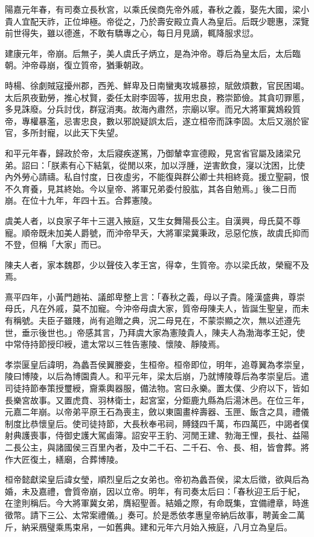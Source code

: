 \begin{pinyinscope}
陽嘉元年春，有司奏立長秋宮，以乘氏侯商先帝外戚，春秋之義，娶先大國，梁小貴人宜配天祚，正位坤極。帝從之，乃於壽安殿立貴人為皇后。后既少聰惠，深覽前世得失，雖以德進，不敢有驕專之心，每日月見謫，輒降服求愆。

建康元年，帝崩。后無子，美人虞氏子炳立，是為沖帝。尊后為皇太后，太后臨朝。沖帝尋崩，復立質帝，猶秉朝政。

時楊、徐劇賊寇擾州郡，西羌、鮮卑及日南蠻夷攻城暴掠，賦斂煩數，官民困竭。太后夙夜勤勞，推心杖賢，委任太尉李固等，拔用忠良，務崇節儉。其貪叨罪慝，多見誅廢。分兵討伐，群寇消夷。故海內肅然，宗廟以寧。而兄大將軍冀鴆殺質帝，專權暴濫，忌害忠良，數以邪說疑誤太后，遂立桓帝而誅李固。太后又溺於宦官，多所封寵，以此天下失望。

和平元年春，歸政於帝，太后寢疾遂篤，乃御輦幸宣德殿，見宮省官屬及諸梁兄弟。詔曰：「朕素有心下結氣，從閒以來，加以浮腫，逆害飲食，寖以沈困，比使內外勞心請禱。私自忖度，日夜虛劣，不能復與群公卿士共相終竟。援立聖嗣，恨不久育養，見其終始。今以皇帝、將軍兄弟委付股肱，其各自勉焉。」後二日而崩。在位十九年，年四十五。合葬憲陵。

虞美人者，以良家子年十三選入掖庭，又生女舞陽長公主。自漢興，母氏莫不尊寵。順帝既未加美人爵號，而沖帝早夭，大將軍梁冀秉政，忌惡佗族，故虞氏抑而不登，但稱「大家」而已。

陳夫人者，家本魏郡，少以聲伎入孝王宮，得幸，生質帝。亦以梁氏故，榮寵不及焉。

熹平四年，小黃門趙祐、議郎卑整上言：「春秋之義，母以子貴。隆漢盛典，尊崇母氏，凡在外戚，莫不加寵。今沖帝母虞大家，質帝母陳夫人，皆誕生聖皇，而未有稱號。夫臣子雖賤，尚有追贈之典，況二母見在，不蒙崇顯之次，無以述遵先世，垂示後世也。」帝感其言，乃拜虞大家為憲陵貴人，陳夫人為渤海孝王妃，使中常侍持節授印綬，遣太常以三牲告憲陵、懷陵、靜陵焉。

孝崇匽皇后諱明，為蠡吾侯翼媵妾，生桓帝。桓帝即位，明年，追尊翼為孝崇皇，陵曰博陵，以后為博園貴人。和平元年，梁太后崩，乃就博陵尊后為孝崇皇后。遣司徒持節奉策授璽綬，齎乘輿器服，備法物。宮曰永樂。置太僕、少府以下，皆如長樂宮故事。又置虎賁、羽林衛士，起宮室，分鉅鹿九縣為后湯沐邑。在位三年，元嘉二年崩。以帝弟平原王石為喪主，斂以東園畫梓壽器、玉匣、飯含之具，禮儀制度比恭懷皇后。使司徒持節，大長秋奉弔祠，賻錢四千萬，布四萬匹，中謁者僕射典護喪事，侍御史護大駕鹵簿。詔安平王豹、河閒王建、勃海王悝，長社、益陽二長公主，與諸國侯三百里內者，及中二千石、二千石、令、長、相，皆會葬。將作大匠復土，繕廟，合葬博陵。

桓帝懿獻梁皇后諱女瑩，順烈皇后之女弟也。帝初為蠡吾侯，梁太后徵，欲與后為婚，未及嘉禮，會質帝崩，因以立帝。明年，有司奏太后曰：「春秋迎王后于紀，在塗則稱后。今大將軍冀女弟，膺紹聖善。結婚之際，有命既集，宜備禮章，時進徵幣。請下三公、太常案禮儀。」奏可。於是悉依孝惠皇帝納后故事，聘黃金二萬斤，納采鴈璧乘馬束帛，一如舊典。建和元年六月始入掖庭，八月立為皇后。


\end{pinyinscope}
